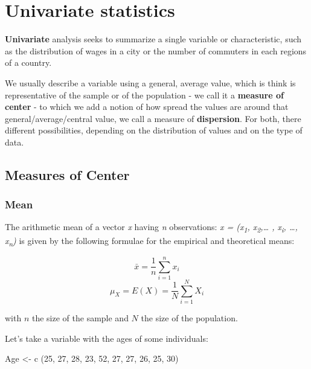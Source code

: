 \documentclass[
  letterpaper,
  DIV=11,
  numbers=noendperiod]{scrreprt}
\newenvironment{Shaded}{\begin{snugshade}}{\end{snugshade}}
\newcommand{\DecValTok}[1]{\textcolor[rgb]{0.68,0.00,0.00}{#1}}
\newcommand{\FunctionTok}[1]{\textcolor[rgb]{0.28,0.35,0.67}{#1}}
\newcommand{\NormalTok}[1]{\textcolor[rgb]{0.00,0.23,0.31}{#1}}
\newcommand{\OtherTok}[1]{\textcolor[rgb]{0.00,0.23,0.31}{#1}}
\begin{document}
\chapter{Univariate statistics}\label{univariate-statistics}

\textbf{Univariate} analysis seeks to summarize a single variable or
characteristic, such as the distribution of wages in a city or the
number of commuters in each regions of a country.

We usually describe a variable using a general, average value, which is
think is representative of the sample or of the population - we call it
a \textbf{measure of center} - to which we add a notion of how spread
the values are around that general/average/central value, we call a
measure of \textbf{dispersion}. For both, there different possibilities,
depending on the distribution of values and on the type of data.

\section{Measures of Center}\label{measures-of-center}

\subsection{Mean}\label{mean}

The arithmetic mean of a vector \emph{x} having \emph{n} observations:
\emph{x = (x\textsubscript{1}, x\textsubscript{2},\ldots{} ,
x\textsubscript{i}, \ldots, x\textsubscript{n})} is given by the
following formulae for the empirical and theoretical means:

\[\bar{x} = \dfrac{1}{n} \sum_{i=1}^n x_i\]
\[\mu_X = E(X) = \dfrac{1}{N} \sum_{i=1}^N X_i\]

with \(n\) the size of the sample and \(N\) the size of the population.

Let's take a variable with the ages of some individuals:

\begin{Shaded}
\begin{Highlighting}[]
\NormalTok{Age }\OtherTok{\textless{}{-}} \FunctionTok{c}\NormalTok{ (}\DecValTok{25}\NormalTok{, }\DecValTok{27}\NormalTok{, }\DecValTok{28}\NormalTok{, }\DecValTok{23}\NormalTok{, }\DecValTok{52}\NormalTok{, }\DecValTok{27}\NormalTok{, }\DecValTok{27}\NormalTok{, }\DecValTok{26}\NormalTok{, }\DecValTok{25}\NormalTok{, }\DecValTok{30}\NormalTok{)}
\end{Highlighting}
\end{Shaded}
\end{document}
